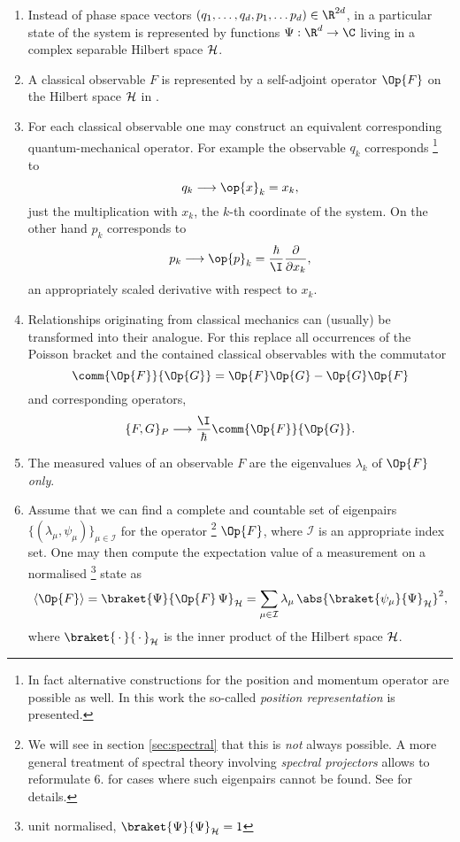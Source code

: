 \begin{enumerate}
	\item Instead of phase space vectors $\clphase \in \R^{2d}$,
		in \QM a particular state of the system is represented
		by functions $\Psi : \R^d \to \C$
		living in a complex separable Hilbert space $\mathcal{H}$.
	\item A classical observable $F$ is represented by a
		self-adjoint operator $\Op{F}$ on the Hilbert space $\mathcal{H}$ in \QM.
	\item For each classical observable one may construct an equivalent
		corresponding quantum-mechanical operator.
		For example the observable $q_k$ corresponds%
		\footnote{In fact alternative constructions for the position and momentum
				operator are possible as well. In this work the so-called
				\textit{position representation} is presented.}
		to~\cite{Shankar1994, Mueller2000}
		\[ q_k \longrightarrow \op{x}_k = x_k, \]
		\ie just the multiplication with $x_k$,
		the $k$-th coordinate of the system.
		On the other hand $p_k$ corresponds to~\cite{Shankar1994, Mueller2000}
		\[ p_k \longrightarrow \op{p}_k
			= \frac{\hbar}{\I} \frac{\partial}{\partial x_k}, \]
		an appropriately scaled derivative with respect to $x_k$.
	\item Relationships originating from classical mechanics
		can (usually) be transformed into their \QM analogue.
		For this replace all occurrences of the Poisson bracket
		and the contained classical observables with the commutator
		\begin{equation}
			\comm{\Op{F}}{\Op{G}} = \Op{F} \Op{G} - \Op{G} \Op{F}
			\label{eqn:Operator}
		\end{equation}
		and corresponding operators, \ie~\cite{Shankar1994}
		\[ \{F, G\}_P \longrightarrow \frac{\I}{\hbar} \comm{\Op{F}}{\Op{G}}. \]
	\item The measured values of an observable $F$
		are the eigenvalues $\lambda_k$ of $\Op{F}$ \emph{only}.
	\item Assume that we can find a complete and countable
		set of eigenpairs $\{ (\lambda_\mu, \psi_\mu) \}_{\mu \in \mathcal{I}}$
		for the operator%
		\footnote{We will see in section \vref{sec:spectral}
		that this is \emph{not} always possible.
		A more general treatment of spectral theory involving
		\textit{spectral projectors} allows to reformulate 6. for cases
		where such eigenpairs cannot be found.
		See \cite{Helffer2013} for details.}
		$\Op{F}$, where $\mathcal{I}$ is an appropriate index set.
		One may then compute the expectation value of a measurement
		on a normalised%
		\footnote{unit normalised, \ie $\braket{\Psi}{\Psi}_\hilbert = 1$}
		state as
		\begin{equation}
			\langle \Op{F} \rangle
				= \braket{\Psi}{\Op{F} \, \Psi}_\hilbert
				= \sum_{\mu\in\mathcal{I}} \lambda_\mu \,
							\abs{\braket{\psi_\mu}{\Psi}_\hilbert}^2,
			\label{eqn:QMExpectation}
		\end{equation}
		where $\braket{\slot}{\slot}_\hilbert$ is the inner product
		of the Hilbert space $\mathcal{H}$.
\end{enumerate}
